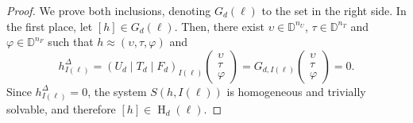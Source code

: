 \documentclass[a4paper,10pt]{article}
\newcommand{\bbd}{\mathbb{D}}
\DeclareMathOperator{\Ho}{H}
\begin{document}
\begin{proof}
We prove both inclusions, denoting \(G_d(\ell)\) to the set in the right side. In the first place, let \([h] \in G_d(\ell)\). Then, there exist \(\upsilon \in \bbd^{n_U}\), \(\tau \in \bbd^{n_T}\) and \(\varphi \in \bbd^{n_F}\) such that \(h \approx (\upsilon,\tau,\varphi)\) and
\[
h^{\Delta}_{I(\ell)}= 
\left(U_{d} \mid T_{d} \mid F_{d}\right)_{I(\ell)}
\left(\begin{array}{c}\upsilon\\ \tau\\ \varphi\end{array}\right)
= G_{d,I(\ell)}
\left(\begin{array}{c}\upsilon\\ \tau\\ \varphi\end{array}\right) = 0.
\]
Since \(h^{\Delta}_{I(\ell)} =0\), the system \(S(h,I(\ell))\) is homogeneous and trivially solvable, and therefore \([h] \in \Ho_d(\ell)\).


\end{proof}
\end{document}
